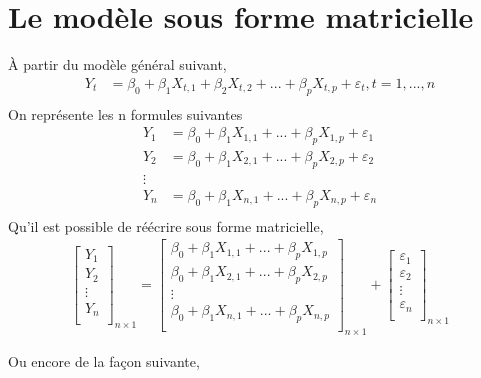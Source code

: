\documentclass[11pt,french]{report}
\begin{document}
\section{Le modèle sous forme matricielle}
À partir du modèle général suivant, 
\begin{align*}
Y_t &= \beta_0 + \beta_1X_{t,1} + \beta_2X_{t,2} + ... + \beta_pX_{t,p} + \varepsilon_t, t = 1,...,n \\
\end{align*}
On représente les n formules suivantes
\begin{align*}
Y_1 &= \beta_0 + \beta_1X_{1,1} + ... + \beta_pX_{1,p} + \varepsilon_1 \\
Y_2 &= \beta_0 + \beta_1X_{2,1} + ... + \beta_pX_{2,p} + \varepsilon_2 \\
\vdots& \\
Y_n &= \beta_0 + \beta_1X_{n,1} + ... + \beta_pX_{n,p} + \varepsilon_n \\
\end{align*}
Qu'il est possible de réécrire sous forme matricielle,
\begin{align*}
\begin{bmatrix} 
Y_1  \\
Y_2  \\
\vdots \\
Y_n \\
\end{bmatrix}_{n\times 1} =
\begin{bmatrix} 
\beta_0 + \beta_1X_{1,1} + ... + \beta_pX_{1,p} \\
\beta_0 + \beta_1X_{2,1} + ... + \beta_pX_{2,p}  \\
\vdots \\
\beta_0 + \beta_1X_{n,1} + ... + \beta_pX_{n,p} \\
\end{bmatrix}_{n\times 1} + 
\begin{bmatrix} 
\varepsilon_1 \\
\varepsilon_2 \\
\vdots \\
\varepsilon_n \\
\end{bmatrix}_{n\times 1} 
\end{align*}

Ou encore de la façon suivante,
\end{document}
